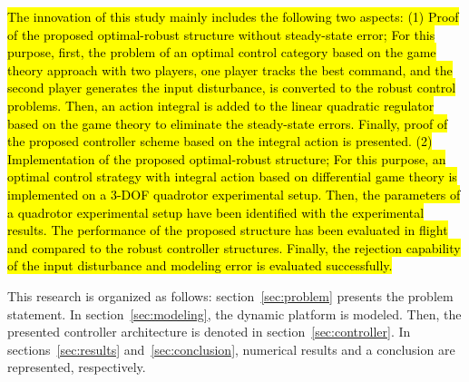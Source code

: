 \documentclass[3p]{elsarticle}
\begin{document}
\hl{The innovation of this study mainly includes the following two aspects: (1) Proof of the proposed optimal-robust structure without steady-state error; For this purpose, first, the problem of an optimal control category based on the game theory approach with two players, one player tracks the best command, and the second player generates the input disturbance, is converted to the robust control problems. Then, an action integral is added to the linear quadratic regulator based on the game theory to eliminate the steady-state errors. Finally, proof of the proposed controller scheme based on the integral action is presented. (2) Implementation of the proposed optimal-robust structure; For this purpose, an optimal control strategy with integral action based on differential game theory is implemented on a 3-DOF quadrotor experimental setup. Then, the parameters of a quadrotor experimental setup have been identified with the experimental results. The performance of the proposed structure has been evaluated in flight and compared to the robust controller structures. Finally, the rejection capability of the input disturbance and modeling error is evaluated successfully.}


This research is organized as follows: section~\ref{sec:problem} presents the problem statement.
In section~\ref{sec:modeling}, the dynamic platform is modeled. Then, the presented controller architecture is denoted in section~\ref{sec:controller}. 
In sections~\ref{sec:results} and~\ref{sec:conclusion}, numerical results and a conclusion are represented, respectively.
\end{document}
